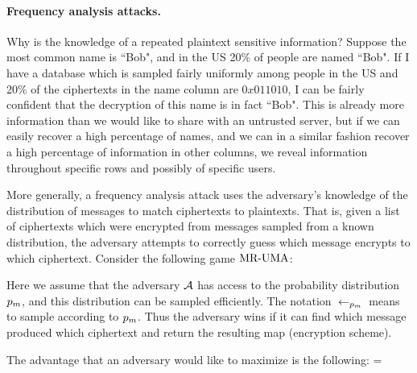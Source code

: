 \paragraph{Frequency analysis attacks.}
    Why is the knowledge of a repeated plaintext sensitive information? Suppose the most common name is ``Bob", and in the US 20\% of people are named ``Bob". If I have a database which is sampled fairly uniformly among people in the US and 20\% of the ciphertexts in the name column are $0x011010$, I can be fairly confident that the decryption of this name is in fact ``Bob". This is already more information than we would like to share with an untrusted server, but if we can easily recover a high percentage of names, and we can in a similar fashion recover a high percentage of information in other columns, we reveal information throughout specific rows and possibly of specific users.
    
    More generally, a frequency analysis attack uses the adversary's knowledge of the distribution of messages to match ciphertexts to plaintexts. That is, given a list of ciphertexts which were encrypted from messages sampled from a known distribution, the adversary attempts to correctly guess which message encrypts to which ciphertext. Consider the following game $\textnormal{MR-UMA}$:
    
\begin{figure}[H]
\centering
{}
\end{figure}

Here we assume that the adversary ${\mathcal A}$ has access to the probability distribution $p_m$, and this distribution can be sampled efficiently. The notation ${\:\leftarrow_{p_m}\:}$ means to sample according to $p_m$. Thus the adversary wins if it can find which message produced which ciphertext and return the resulting map (encryption scheme).

The advantage that an adversary would like to maximize is the following:
\bnm
    = 
\enm

